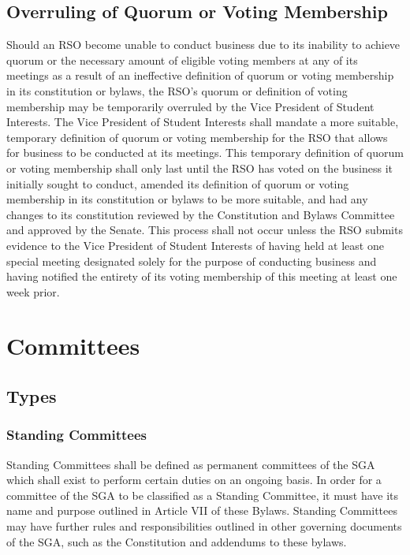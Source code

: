 \documentclass[12pt]{scrreprt}
\begin{document}
\section{Overruling of Quorum or Voting Membership}
Should an RSO become unable to conduct business due to its inability to achieve quorum or the necessary amount of eligible voting members at any of its meetings as a result of an ineffective definition of quorum or voting membership in its constitution or bylaws, the RSO’s quorum or definition of voting membership may be temporarily overruled by the Vice President of Student Interests. The Vice President of Student Interests shall mandate a more suitable, temporary definition of quorum or voting membership for the RSO that allows for business to be conducted at its meetings. This temporary definition of quorum or voting membership shall only last until the RSO has voted on the business it initially sought to conduct, amended its definition of quorum or voting membership in its constitution or bylaws to be more suitable, and had any changes to its constitution reviewed by the Constitution and Bylaws Committee and approved by the Senate. This process shall not occur unless the RSO submits evidence to the Vice President of Student Interests of having held at least one special meeting designated solely for the purpose of conducting business and having notified the entirety of its voting membership of this meeting at least one week prior.

\chapter{Committees}

\section{Types}

\subsection{Standing Committees}
Standing Committees shall be defined as permanent committees of the SGA which shall exist to perform certain duties on an ongoing basis. In order for a committee of the SGA to be classified as a Standing Committee, it must have its name and purpose outlined in Article VII of these Bylaws. Standing Committees may have further rules and responsibilities outlined in other governing documents of the SGA, such as the Constitution and addendums to these bylaws.
\end{document}
